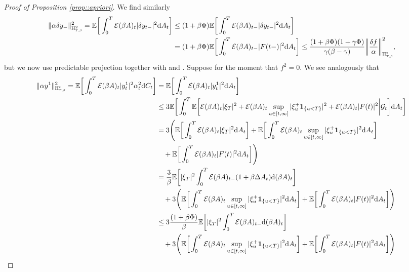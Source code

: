 \documentclass[10pt]{article} %
\newcommand\cE{\mathcal E}
\newcommand\cG{\mathcal G}
\newcommand{\smalltext}[1]{\text{\fontsize{4}{4}\selectfont$#1$}}
\def \E{\mathbb{E}}
\def \H{\mathbb{H}}
\def\d{\mathrm{d}}
\begin{document}
\begin{proof}[Proof of Proposition \ref{prop::apriori}]
We find similarly
\begin{align}
	\|\alpha \delta y_-\|^2_{\H^2_{\smalltext{T}\smalltext{,}\smalltext{\beta}}} 
	= \E \bigg[ \int_0^T \cE(\beta A)_t |\delta y_{t-}|^2 \d A_t \bigg] 
&\leq (1+\beta\Phi)\E \bigg[ \int_0^T \cE(\beta A)_{t-}|\delta y_{t-}|^2 \d A_t \bigg] \label{eq::exp_minus_y_minus}\\
	&= (1+\beta\Phi)\E \bigg[ \int_0^T \cE(\beta A)_{t-} |F(t-)|^2 \d A_t \bigg]
	\leq \frac{(1+\beta\Phi)(1+\gamma\Phi)}{\gamma(\beta - \gamma)} \bigg\|\frac{\delta f}{\alpha}\bigg\|^2_{\mathbb{H}^\smalltext{2}_{\smalltext{T}\smalltext{,}\smalltext{\beta}}}, \nonumber
\end{align}
but we now use predictable projection together with  and  \cite[Theorem VI.57]{dellacherie1982probabilities}. Suppose for the moment that $f^2 = 0$. We see analogously that
\begin{align*}
	\|\alpha y^1\|^2_{\H^\smalltext{2}_{\smalltext{T}\smalltext{,}\smalltext{\beta}}} = \E \bigg[ \int_0^T \cE(\beta A)_t |y^1_t|^2 \alpha^2_t \d C_t \bigg] 
	&= \E \bigg[ \int_0^T \cE(\beta A)_t |y^1_{t}|^2 \d A_t \bigg] \\
	&\leq 3\E\bigg[ \int_0^T \E \bigg[\cE(\beta A)_t|\xi_T|^2 + \cE(\beta A)_t\sup_{u \in [t,\infty]}|\xi^+_u \mathbf{1}_{\{u < T\}}|^2 + \cE(\beta A)_t |F(t)|^2 \bigg| \cG_{t} \bigg] \d A_t \bigg] \\
	&= 3\Bigg(\E \bigg[ \int_0^T \cE(\beta A)_t |\xi_T|^2 \d A_t \bigg] + \E \bigg[ \int_0^T \cE(\beta A)_t \sup_{u \in [t,\infty]}|\xi^+_u \mathbf{1}_{\{u < T\}}|^2 \d A_t \bigg] \\
	&\quad+ \E \bigg[ \int_0^T \cE(\beta A)_t |F(t)|^2 \d A_t \bigg] \Bigg) \\
	&= \frac{3}{\beta}\E \bigg[ |\xi_T|^2 \int_0^T \cE(\beta A)_{t-}(1+\beta\Delta A_t) \d (\beta A)_t \bigg] \\
	&\quad+3\Bigg( \E \bigg[ \int_0^T \cE(\beta A)_t \sup_{u \in [t,\infty]}|\xi^+_u \mathbf{1}_{\{u < T\}}|^2 \d A_t \bigg] + \E \bigg[ \int_0^T \cE(\beta A)_t |F(t)|^2 \d A_t \bigg] \Bigg) \\
	&\leq 3\frac{(1+\beta\Phi)}{\beta}\E \bigg[ |\xi_T|^2 \int_0^T \cE(\beta A)_{t-} \d (\beta A)_t \bigg]\\
	&\quad+ 3\Bigg( \E \bigg[ \int_0^T \cE(\beta A)_t \sup_{u \in [t,\infty]}|\xi^+_u \mathbf{1}_{\{u < T\}}|^2 \d A_t \bigg] +\E \bigg[ \int_0^T \cE(\beta A)_t |F(t)|^2 \d A_t \bigg] \Bigg) \\

\end{align*}
\end{proof}
\end{document}
